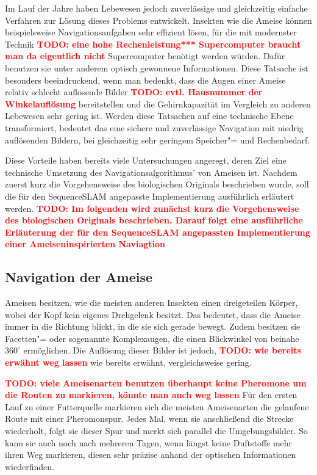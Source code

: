 \documentclass[12pt,a4paper,titlepage]{scrartcl}
\newcommand{\todo}[1]{\textcolor{red}{\textbf{TODO: #1}}}
\begin{document}
Im Lauf der Jahre haben Lebewesen jedoch zuverlässige und gleichzeitig einfache Verfahren zur Lösung dieses Problems entwickelt. Insekten wie die Ameise können beispielsweise Navigationsaufgaben sehr effizient lösen, für die mit modernster Technik \todo{eine hohe Rechenleistung*** Supercomputer braucht man da eigentlich nicht} Supercomputer benötigt werden würden. Dafür benutzen sie unter anderem optisch gewonnene Informationen. Diese Tatsache ist besonders beeindruckend, wenn man bedenkt, dass die Augen einer Ameise relativ schlecht auflösende Bilder \todo{evtl. Hausnummer der Winkelauflösung }bereitstellen und die Gehirnkapazität im Vergleich zu anderen Lebewesen sehr gering ist. Werden diese Tatsachen auf eine technische Ebene transformiert, bedeutet das eine sichere und zuverlässige Navigation mit niedrig auflösenden Bildern, bei gleichzeitig sehr geringem Speicher"= und Rechenbedarf.

Diese Vorteile haben bereits viele Untersuchungen angeregt, deren Ziel eine technische Umsetzung des Navigationsalgorithmus' von Ameisen ist. Nachdem zuerst kurz die Vorgehensweise des biologischen Originals beschrieben wurde, soll die für den SequenceSLAM angepasste Implementierung ausführlich erläutert werden. \todo{Im folgenden wird zunächst kurz die Vorgehensweise des biologischen Originals beschrieben. Darauf folgt eine ausführliche Erläuterung der  für den SequenceSLAM angepassten Implementierung einer Ameiseninspirierten Naviagtion }
\subsection{Navigation der Ameise}
Ameisen besitzen, wie die meisten anderen Insekten einen dreigeteilen Körper, wobei der Kopf kein eigenes Drehgelenk besitzt. Das bedeutet, dass die Ameise immer in die Richtung blickt, in die sie sich gerade bewegt. Zudem besitzen sie Facetten"= oder sogenannte Komplexaugen, die einen Blickwinkel von beinahe $360^{\circ}$ ermöglichen. Die Auflösung dieser Bilder ist jedoch, \todo{wie bereits erwähnt weg lassen} wie bereits erwähnt, vergleichsweise gering. 

\todo{viele Ameisenarten benutzen überhaupt keine Pheromone um die Routen zu markieren, könnte man auch weg lassen} Für den ersten Lauf zu einer Futterquelle markieren sich die meisten Ameisenarten die gelaufene Route mit einer Pheromonspur. Jedes Mal, wenn sie anschließend die Strecke wiederholt, folgt sie dieser Spur und merkt sich parallel die Umgebungsbilder. So kann sie auch noch nach mehreren Tagen, wenn längst keine Duftstoffe mehr ihren Weg markieren, diesen sehr präzise anhand der optischen Informationen wiederfinden. 
\end{document}
